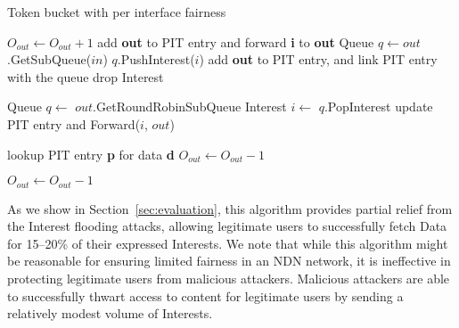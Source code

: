 \begin{algorithm}[h]
\footnotesize
\caption{\small Token bucket with per interface fairness}
\label{alg:queuing}
\begin{algorithmic}[1]
     
\EndFor

\vspace{0.1cm}

     
        \State $O_{out} \leftarrow O_{out} + 1$  
        \State add \textbf{out} to PIT entry and forward \textbf{i} to \textbf{out}
    \Else
        \State Queue $q \leftarrow out$.GetSubQueue($in$)
           \State $q$.PushInterest($i$)
           \State add \textbf{out} to PIT entry, and link PIT entry with the queue
        \Else
           \State drop Interest
        \EndIf
    \EndIf
\EndFunction

\vspace{0.1cm}

\State{} 
    \State Queue $q \leftarrow$ $out$.GetRoundRobinSubQueue 
    \State Interest $i \leftarrow$ $q$.PopInterest
    \State update PIT entry and Forward($i$, $out$)
\EndFunction

\vspace{0.1cm}

   \State lookup PIT entry \textbf{p} for data \textbf{d}
        \State $O_{out} \leftarrow O_{out} - 1$ 
   \EndFor
\EndFunction

\vspace{0.1cm}

        \State $O_{out} \leftarrow O_{out} - 1$ 
   \EndFor
\EndFunction


\end{algorithmic}
\end{algorithm}


As we show in Section~\ref{sec:evaluation}, this algorithm provides partial relief from the Interest flooding attacks, allowing legitimate users to successfully fetch Data for 15--20\% of their expressed Interests. 
We note that while this algorithm might be reasonable for ensuring limited fairness in an NDN network, it is ineffective in protecting legitimate users from malicious attackers. 
Malicious attackers are able to successfully thwart access to content for legitimate users by sending a relatively modest volume of Interests.


